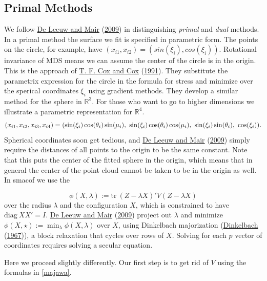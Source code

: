 \documentclass[
  12pt,
]{book}
\theoremstyle{definition}
\theoremstyle{definition}
\theoremstyle{definition}
\theoremstyle{definition}
\theoremstyle{remark}
\begin{document}
\hypertarget{circprimal}{%
\subsection{Primal Methods}\label{circprimal}}

We follow \protect\hyperlink{ref-deleeuw_mair_A_09c}{De Leeuw and Mair} (\protect\hyperlink{ref-deleeuw_mair_A_09c}{2009}) in distinguishing \emph{primal} and \emph{dual} methods. In a primal
method the surface we fit is specified in parametric form. The points on the circle, for
example, have \((x_{i1},x_{i2})=(sin(\xi_i),cos(\xi_i))\). Rotational invariance of MDS
means we can assume the center of the circle is in the origin. This is the approach of \protect\hyperlink{ref-cox_cox_91}{T. F. Cox and Cox} (\protect\hyperlink{ref-cox_cox_91}{1991}). They substitute the parametrix expression for the circle in the formula for stress and minimize over the sperical coordinates \(\xi_i\) using gradient methods. They develop a similar method for the sphere in \(\mathbb{R}^3\). For those who want to go to higher dimensions we illustrate a parametric representation for \(\mathbb{R}^4\).
\[
(x_{i1},x_{i2},x_{i3},x_{i4})=\\(\sin(\xi_i)\cos(\theta_i)\sin(\mu_i),\
\sin(\xi_i)\cos(\theta_i)\cos(\mu_i),\ \sin(\xi_i)\sin(\theta_i),\ \cos(\xi_i)).
\]
Spherical coordinates soon get tedious, and \protect\hyperlink{ref-deleeuw_mair_A_09c}{De Leeuw and Mair} (\protect\hyperlink{ref-deleeuw_mair_A_09c}{2009}) simply require the
distances of all points to the origin to be the same constant. Note that this puts the center of the fitted sphere in the origin, which means that in general the center of the
point cloud cannot be taken to be in the origin as well. In smacof we use the

\[
\phi(X,\lambda):=\text{tr}\ (Z-\lambda X)'V(Z-\lambda X)
\]
over the radius \(\lambda\) and the configuration \(X\), which is constrained to have \(\text{diag}\ XX'=I\). \protect\hyperlink{ref-deleeuw_mair_A_09c}{De Leeuw and Mair} (\protect\hyperlink{ref-deleeuw_mair_A_09c}{2009}) project out \(\lambda\) and minimize \(\phi(X,\star):=\min_\lambda\phi(X,\lambda)\) over \(X\), using Dinkelbach majorization (\protect\hyperlink{ref-dinkelbach_67}{Dinkelbach} (\protect\hyperlink{ref-dinkelbach_67}{1967})), a block relaxation that cycles over rows of \(X\). Solving for each
\(p\) vector of coordinates requires solving a secular equation.

Here we proceed slightly differently. Our first step is to get rid of \(V\) using the formulas in \ref{majawa}.
\end{document}
